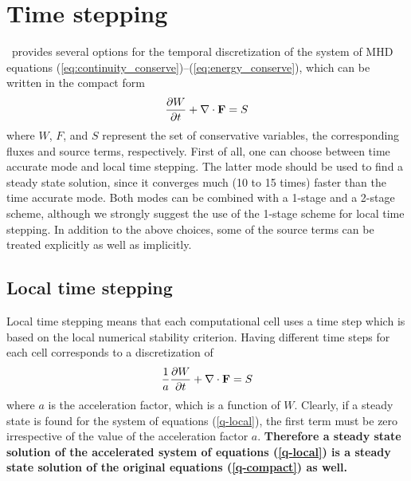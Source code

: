%
%

\section{Time stepping \label{section:time_stepping}}

\BATSRUS\ provides several options for the temporal discretization of
the system of MHD equations (\ref{eq:continuity_conserve})--(\ref{eq:energy_conserve}), 
which can be written in the compact form
\begin{equation}
\frac{\partial W}{\partial t} + \nabla\cdot \mathbf F = S
\label{q-compact}
\end{equation}
where $W$, $F$, and $S$ represent the set of conservative variables, 
the corresponding fluxes and source terms, respectively. 
First of all, one can choose between time accurate mode and local time 
stepping.
The latter mode should be used to find a steady state solution, since
it converges much (10 to 15 times) faster than the time accurate mode.
Both modes can be combined with a 1-stage and a 2-stage scheme, although
we strongly suggest the use of the 1-stage scheme for local time stepping.
In addition to the above choices, some of the source terms can be treated
explicitly as well as implicitly.

\subsection{Local time stepping \label{section:local}}

Local time stepping means that each computational cell uses a time step
which is based on the local numerical stability criterion. Having different
time steps for each cell corresponds to a discretization of 
\begin{equation}
\frac{1}{a}\frac{\partial W}{\partial t} + \nabla\cdot \mathbf F = S \label{q-local}
\end{equation}
where $a$ is the acceleration factor, which is a function of $W$. 
Clearly, if a steady state is found for the system of equations 
(\ref{q-local}), the first term must be zero irrespective of the value of 
the acceleration factor $a$. {\bf Therefore a steady state solution of
the accelerated system of equations
(\ref{q-local}) is a steady state solution of the original equations
(\ref{q-compact}) as well.} 

